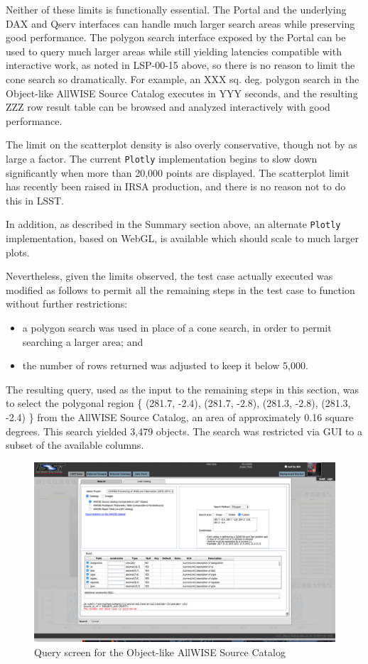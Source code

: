 Neither of these limits is functionally essential.
The Portal and the underlying DAX and Qserv interfaces can handle much larger search areas while preserving good performance.
The polygon search interface exposed by the Portal can be used to query much larger areas while still yielding latencies compatible with interactive work, as noted in LSP-00-15 above,
so there is no reason to limit the cone search so dramatically.
For example, an XXX sq. deg. polygon search in the Object-like AllWISE Source Catalog executes in YYY seconds, and the resulting ZZZ row result table can be browsed and analyzed interactively with good performance.

The limit on the scatterplot density is also overly conservative, though not by as large a factor.
The current \verb|Plotly| implementation begins to slow down significantly when more than 20,000 points are displayed.
The scatterplot limit has recently been raised in IRSA production, and there is no reason not to do this in LSST.

In addition, as described in the Summary section above, an alternate \verb|Plotly| implementation, based on WebGL, is available which should scale to much larger plots.

Nevertheless, given the limits observed, the test case actually executed was modified as follows to permit all the remaining steps in the test case to function without further restrictions:

\begin{itemize}
\item{a polygon search was used in place of a cone search, in order to permit searching a larger area; and}
\item{the number of rows returned was adjusted to keep it below 5,000.}
\end{itemize}

The resulting query, used as the input to the remaining steps in this section,
was to select the polygonal region \{ (281.7, -2.4), (281.7, -2.8), (281.3, -2.8), (281.3, -2.4) \} from the AllWISE Source Catalog,
an area of approximately 0.16 square degrees.
This search yielded 3,479 objects.
The search was restricted via GUI to a subset of the available columns.

\begin{figure}
  \includegraphics[width=\linewidth]{lsp-00-20/step3Search_a.png}
  \caption{Query screen for the Object-like AllWISE Source Catalog}
  \label{fig:lsp-00-20-search}
\end{figure}

